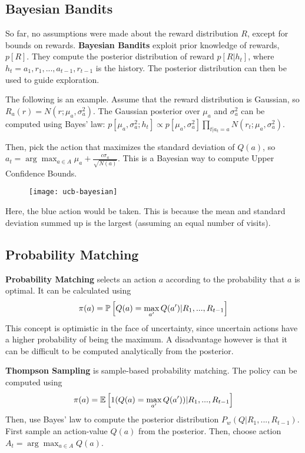 \subsection{Bayesian Bandits}

So far, no assumptions were made about the reward distribution $R$, except for bounds on rewards. \textbf{Bayesian Bandits} exploit prior knowledge of rewards, $p\left[R\right]$. They compute the posterior distribution of reward $p\left[R | h_t\right]$, where $h_t = a_1, r_1, ..., a_{t-1}, r_{t-1}$ is the history. The posterior distribution can then be used to guide exploration.

The following is an example. Assume that the reward distribution is Gaussian, so $R_a(r) = N(r; \mu_a, \sigma_a^2)$. The Gaussian posterior over $\mu_a$ and $\sigma_a^2$ can be computed using Bayes' law: $p[\mu_a, \sigma_a^2; h_t] \propto p[\mu_a, \sigma_a^2] \prod_{t | a_t = a} N(r_t; \mu_a, \sigma_a^2)$.

Then, pick the action that maximizes the standard deviation of $Q(a)$, so $a_t = \arg\max_{a \in A} \mu_a + \frac{c \sigma_a}{\sqrt{N(a)}}$. This is a Bayesian way to compute Upper Confidence Bounds.

\begin{figure}[H]
	\centering
	\texttt{[image: ucb-bayesian]}
\end{figure}

Here, the blue action would be taken. This is because the mean and standard deviation summed up is the largest (assuming an equal number of visits).

\subsection{Probability Matching}

\textbf{Probability Matching} selects an action $a$ according to the probability that $a$ is optimal. It can be calculated using
\begin{equation*}
	\pi(a) = \operatorname{\mathbb{P}} \left[Q(a) = \max_{a'} Q(a') | R_1, ..., R_{t-1}\right]
\end{equation*}
This concept is optimistic in the face of uncertainty, since uncertain actions have a higher probability of being the maximum. A disadvantage however is that it can be difficult to be computed analytically from the posterior.

\textbf{Thompson Sampling} is sample-based probability matching. The policy can be computed using
\begin{equation*}
	\pi(a) = \operatorname{\mathbb{E}}\left[1(Q(a) = \max_{a'} Q(a')) | R_1, ..., R_{t-1}\right]
\end{equation*} 
Then, use Bayes' law to compute the posterior distribution $P_w(Q|R_1, ..., R_{t-1})$. First sample an action-value $Q(a)$ from the posterior. Then, choose action $A_t = \arg\max_{a \in A} Q(a)$.

